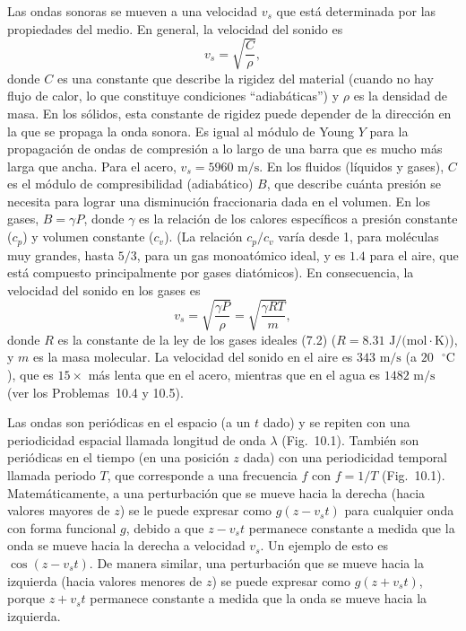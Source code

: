 \documentclass[12pt]{book}
\begin{document}
Las ondas sonoras se mueven a una velocidad $v_s$ que está determinada por las propiedades del medio. En general, la velocidad del sonido es
\begin{equation}
v_s = \sqrt{\frac{C}{\rho}},
\label{eq:10.1}
\end{equation}
donde $C$ es una constante que describe la rigidez del material (cuando no hay flujo de calor, lo que constituye condiciones ``adiabáticas'') y $\rho$ es la densidad de masa. En los sólidos, esta constante de rigidez puede depender de la dirección en la que se propaga la onda sonora. Es igual al módulo de Young $Y$ para la propagación de ondas de compresión a lo largo de una barra que es mucho más larga que ancha. Para el acero, $v_s = 5960\text{ m/s}$. En los fluidos (líquidos y gases), $C$ es el módulo de compresibilidad (adiabático) $B$, que describe cuánta presión se necesita para lograr una disminución fraccionaria dada en el volumen. En los gases, $B = \gamma P$, donde $\gamma$ es la relación de los calores específicos a presión constante ($c_p$) y volumen constante ($c_v$). (La relación $c_p/c_v$ varía desde 1, para moléculas muy grandes, hasta $5/3$, para un gas monoatómico ideal, y es $1.4$ para el aire, que está compuesto principalmente por gases diatómicos). En consecuencia, la velocidad del sonido en los gases es
\begin{equation}
v_s = \sqrt{\frac{\gamma P}{\rho}} = \sqrt{\frac{\gamma RT}{m}},
\label{eq:10.2}
\end{equation}
donde $R$ es la constante de la ley de los gases ideales (7.2) ($R = 8.31\text{ J/(mol}\cdot\text{K)}$), y $m$ es la masa molecular. La velocidad del sonido en el aire es $343\text{ m/s}$ (a $20\text{ }^{\circ}\text{C}$), que es $15\times$ más lenta que en el acero, mientras que en el agua es $1482\text{ m/s}$ (ver los Problemas~10.4 y 10.5).

Las ondas son periódicas en el espacio (a un $t$ dado) y se repiten con una periodicidad espacial llamada longitud de onda $\lambda$ (Fig.~10.1). También son periódicas en el tiempo (en una posición $z$ dada) con una periodicidad temporal llamada periodo $T$, que corresponde a una frecuencia $f$ con $f = 1/T$ (Fig.~10.1). Matemáticamente, a una perturbación que se mueve hacia la derecha (hacia valores mayores de $z$) se le puede expresar como $g(z - v_s t)$ para cualquier onda con forma funcional $g$, debido a que $z - v_s t$ permanece constante a medida que la onda se mueve hacia la derecha a velocidad $v_s$. Un ejemplo de esto es $\cos(z - v_s t)$. De manera similar, una perturbación que se mueve hacia la izquierda (hacia valores menores de $z$) se puede expresar como $g(z + v_s t)$, porque $z + v_s t$ permanece constante a medida que la onda se mueve hacia la izquierda.
\end{document}
